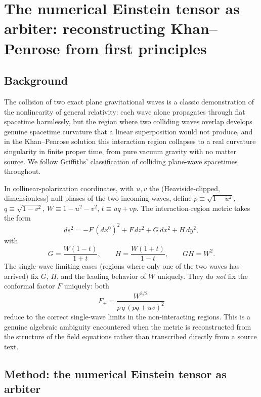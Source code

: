 \documentclass[aps,onecolumn,10pt,nofootinbib]{revtex4-2}
\begin{document}
\section{The numerical Einstein tensor as arbiter: reconstructing Khan--Penrose from first principles}
\label{sec:arbiter}

\subsection{Background}

The collision of two exact plane gravitational waves is a classic
demonstration of the nonlinearity of general relativity: each wave alone
propagates through flat spacetime harmlessly, but the region where two
colliding waves overlap develops genuine spacetime curvature that a linear
superposition would not produce, and in the Khan--Penrose solution
\cite{KhanPenrose1971} this interaction region collapses to a real
curvature singularity in finite proper time, from pure vacuum gravity with
no matter source. We follow Griffiths' classification of colliding
plane-wave spacetimes \cite{Griffiths1991} throughout.

In collinear-polarization coordinates, with $u,v$ the (Heaviside-clipped,
dimensionless) null phases of the two incoming waves, define
$p \equiv \sqrt{1-u^2}$, $q \equiv \sqrt{1-v^2}$, $W \equiv 1-u^2-v^2$,
$t \equiv uq+vp$. The interaction-region metric takes the form
\begin{equation}
  ds^2 = -F\,(dx^0)^2 + F\,dz^2 + G\,dx^2 + H\,dy^2,
\end{equation}
with
\begin{equation}
  G = \frac{W(1-t)}{1+t}, \qquad
  H = \frac{W(1+t)}{1-t}, \qquad
  GH = W^2.
\end{equation}
The single-wave limiting cases (regions where only one of the two waves
has arrived) fix $G$, $H$, and the leading behavior of $W$ uniquely. They
do \emph{not} fix the conformal factor $F$ uniquely: both
\begin{equation}
  F_\pm = \frac{W^{3/2}}{p\,q\,(pq \pm uv)^2}
\end{equation}
reduce to the correct single-wave limits in the non-interacting regions.
This is a genuine algebraic ambiguity encountered when the metric is
reconstructed from the structure of the field equations rather than
transcribed directly from a source text.

\subsection{Method: the numerical Einstein tensor as arbiter}
\end{document}
